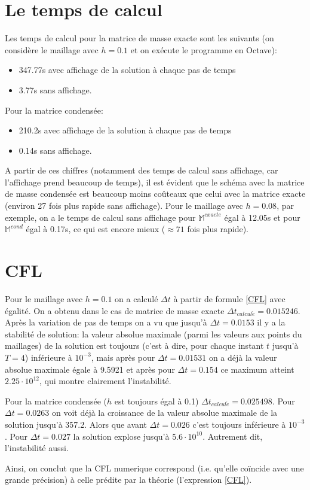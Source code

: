 \documentclass[12pt]{article}
\begin{document}
\section{Le temps de calcul}
Les temps de calcul pour la matrice de masse exacte sont les suivants (on considère le maillage avec $h=0.1$ et on exécute le programme en Octave):
\begin{itemize} 
	\item  347.77s avec affichage de la solution à chaque pas de temps
	\item  3.77s sans affichage.
\end{itemize}
Pour la matrice condensée:
\begin{itemize} 
	\item  210.2s avec affichage de la solution à chaque pas de temps
	\item  0.14s sans affichage.
\end{itemize}
A partir de ces chiffres (notamment des temps de calcul sans affichage, car l'affichage prend beaucoup de temps), il est évident que le schéma avec la matrice de masse condensée est beaucoup moins coûteaux que celui avec la matrice exacte (environ 27 fois plus rapide sans affichage). Pour le maillage avec $h=0.08$, par exemple, on a le temps de calcul sans affichage pour $\mathbb{M}^{exacte}$ égal à 12.05s et pour $\mathbb{M}^{cond}$ égal à 0.17s, ce qui est encore mieux ($\approx 71$ fois plus rapide).

\section{CFL}
Pour le maillage avec $h=0.1$ on a calculé $\Delta t$ à partir de formule \eqref{CFL} avec égalité. On a obtenu dans le cas de matrice de masse exacte $\Delta t_{calcul\acute{e}} = 0.015246$. Après la variation de pas de temps on a vu que jusqu'à $\Delta t = 0.0153$ il y a la stabilité de solution: la valeur absolue maximale (parmi les valeurs aux points du maillages) de la solution est toujours (c'est à dire, pour chaque instant $t$ jusqu'à $T=4$) inférieure à $10^{-3}$, mais après pour $\Delta t = 0.01531$ on a déjà la valeur absolue maximale égale à 9.5921 et après pour $\Delta t = 0.154$ ce maximum atteint $2.25 \cdot 10^{12}$, qui montre clairement l'instabilité.

Pour la matrice condensée ($h$ est toujours égal à 0.1) $\Delta t_{calcul\acute{e}} = 0.025498$. Pour $\Delta t = 0.0263$ on voit déjà la croissance de la valeur absolue maximale de la solution jusqu'à 357.2. Alors que avant $\Delta t = 0.026$ c'est toujours inférieure à $10^{-3}$. Pour $\Delta t = 0.027$ la solution explose jusqu'à $5.6 \cdot 10^{10}$. Autrement dit, l'instabilité aussi.

Ainsi, on conclut que la CFL numerique correspond (i.e. qu'elle coïncide avec une grande précision) à celle prédite par la théorie (l'expression \eqref{CFL}).
\end{document}
